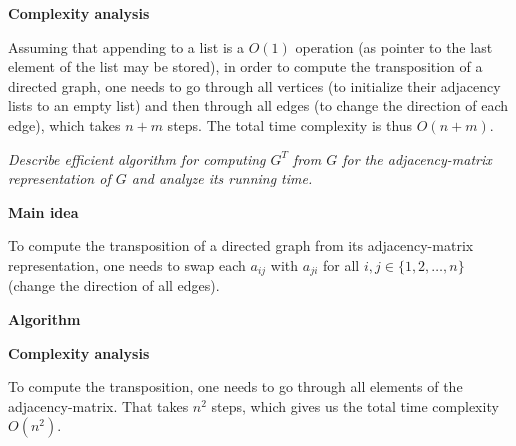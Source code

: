\textbf{Complexity analysis}

Assuming that appending to a list is a $O(1)$ operation (as pointer to the last
element of the list may be stored), in order to compute the transposition of
a directed graph, one needs to go through all vertices (to initialize their
adjacency lists to an empty list) and then through all edges (to change the
direction of each edge), which takes $n + m$ steps. The total time complexity
is thus $O(n + m)$.

\textit{Describe efficient algorithm for computing $G^{T}$ from $G$ for the
adjacency-matrix representation of $G$ and analyze its running time.}

\textbf{Main idea}

To compute the transposition of a directed graph from its adjacency-matrix
representation, one needs to swap each $a_{ij}$ with $a_{ji}$ for all $i, j \in
\{1,2,\dots,n\}$ (change the direction of all edges).

\textbf{Algorithm}

\begin{algorithm}[H]

\end{algorithm}

\textbf{Complexity analysis}

To compute the transposition, one needs to go through all elements of the
adjacency-matrix. That takes $n^{2}$ steps, which gives us the total time
complexity $O(n^{2})$.

